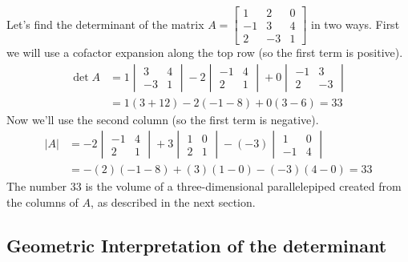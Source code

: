 \begin{example} \label{ex det}
Let's find the determinant of the matrix
$A = 
\begin{bmatrix}
1&2&0\\
-1&3&4\\
2&-3&1
\end{bmatrix}
$
in two ways. First we will use a cofactor expansion along the top row (so the first term is positive).
\begin{align*}
\det A 
&=1\begin{vmatrix}
3&4\\
-3&1
\end{vmatrix}
-2\begin{vmatrix}
-1&4\\
2&1
\end{vmatrix}
+0\begin{vmatrix}
-1&3\\
2&-3
\end{vmatrix} \\
&=1(3+12) -2(-1-8)+0(3-6) = 33
\end{align*}
Now we'll use the second column (so the first term is negative).
\begin{align*} 
 |A| 
&=
-2
\begin{vmatrix}
-1&4\\
2&1
\end{vmatrix}
+3
\begin{vmatrix}
1&0\\
2&1
\end{vmatrix}
-(-3)
\begin{vmatrix}
1&0\\
-1&4
\end{vmatrix} \\
&=-(2)(-1-8) + (3)(1-0)-(-3)(4-0)=33
\end{align*}
The number 33 is the volume of a three-dimensional parallelepiped created from the columns of $A$, as described in the next section.
\end{example}




\subsection{Geometric Interpretation of the determinant}

